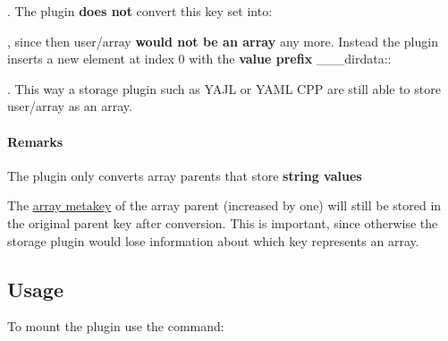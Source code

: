 

. The plugin {\bfseries does not} convert this key set into\+:




, since then {\ttfamily user/array} {\bfseries would not be an array} any more. Instead the plugin inserts a new element at index 0 with the {\bfseries value prefix} {\ttfamily \+\_\+\+\_\+\+\_\+dirdata\+:}\+:




. This way a storage plugin such as Y\+A\+JL or Y\+A\+ML C\+PP are still able to store {\ttfamily user/array} as an array.\hypertarget{autotoc_md172_autotoc_md175}{}\paragraph{Remarks}\label{autotoc_md172_autotoc_md175}

\begin{DoxyItemize}
\item The plugin only converts array parents that store {\bfseries string values}
\item The \hyperlink{doc_decisions_array_md}{array metakey} of the array parent (increased by one) will still be stored in the original parent key after conversion. This is important, since otherwise the storage plugin would lose information about which key represents an array.
\end{DoxyItemize}\hypertarget{autotoc_md172_autotoc_md176}{}\subsection{Usage}\label{autotoc_md172_autotoc_md176}
To mount the plugin use the command\+:

